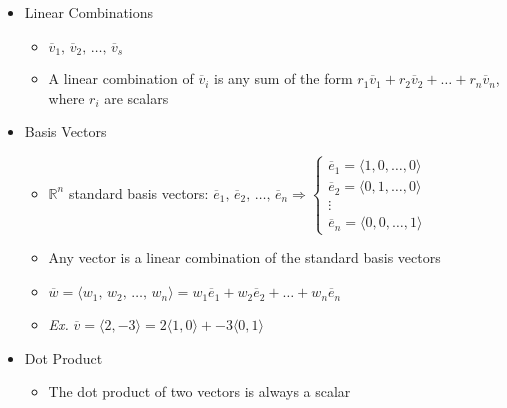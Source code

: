 \begin{itemize}
\begin{itemize}
\begin{itemize}
        \end{itemize}

    \end{itemize}

  \item Linear Combinations

    \begin{itemize}

      \item $\overline{v}_1,\,\overline{v}_2,\,\dots,\,\overline{v}_s$

      \item A linear combination of $\overline{v}_i$ is any sum of the form $r_1\overline{v}_1+r_2\overline{v}_2+\dots+r_n\overline{v}_n$, where $r_i$ are scalars

    \end{itemize}

  \item Basis Vectors

    \begin{itemize}

      \item $\mathbb{R}^n$ standard basis vectors: $\overline{e}_1,\,\overline{e}_2,\,\dots,\,\overline{e}_n\Rightarrow\left\{\begin{array}{c} \overline{e}_1=\langle 1, 0, \dots, 0\rangle\\\overline{e}_2=\langle 0, 1, \dots, 0\rangle\\ \vdots\\ \overline{e}_n = \langle 0, 0, \dots, 1\rangle\end{array}$

      \item Any vector is a linear combination of the standard basis vectors

      \item $\overline{w}=\langle w_1,\,w_2,\,\dots,\,w_n\rangle= w_1\overline{e}_1 + w_2\overline{e}_2 + \dots + w_n\overline{e}_n$

      \item \textit{Ex.} $\overline{v}=\langle 2, -3 \rangle = 2\langle 1, 0 \rangle + -3 \langle 0, 1 \rangle$

    \end{itemize}

  \item Dot Product

    \begin{itemize}

      \item The dot product of two vectors is always a scalar


\end{itemize}
\end{itemize}
